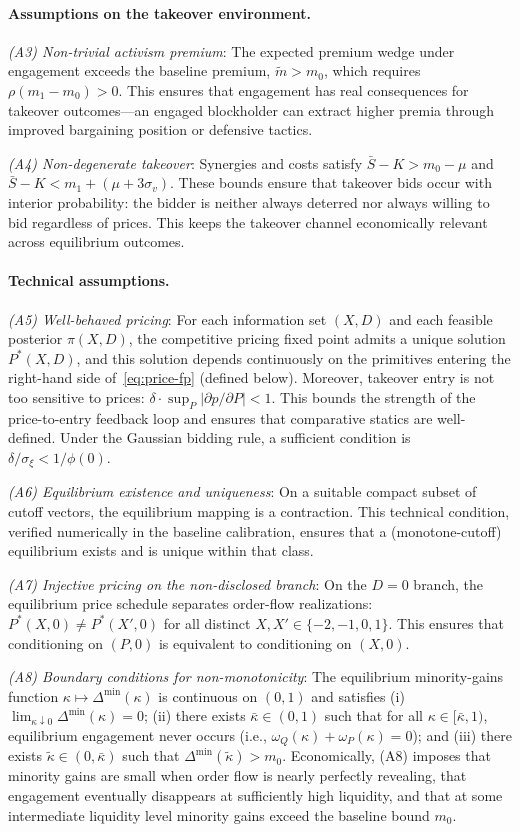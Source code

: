 \documentclass[11pt]{article}
\newcommand{\1}{\mathbf{1}}
\begin{document}
\paragraph{Assumptions on the takeover environment.}
\textit{(A3) Non-trivial activism premium}: The expected premium wedge under engagement exceeds the baseline premium, $\tilde{m}>m_0$, which requires $\rho(m_1-m_0)>0$. This ensures that engagement has real consequences for takeover outcomes---an engaged blockholder can extract higher premia through improved bargaining position or defensive tactics.

\textit{(A4) Non-degenerate takeover}: Synergies and costs satisfy $\bar{S}-K > m_0-\mu$ and $\bar{S}-K < m_1+(\mu+3\sigma_v)$. These bounds ensure that takeover bids occur with interior probability: the bidder is neither always deterred nor always willing to bid regardless of prices. This keeps the takeover channel economically relevant across equilibrium outcomes.

\paragraph{Technical assumptions.}
\textit{(A5) Well-behaved pricing}: For each information set $(X,D)$ and each feasible posterior $\pi(X,D)$, the competitive pricing fixed point admits a unique solution $P^*(X,D)$, and this solution depends continuously on the primitives entering the right-hand side of~\eqref{eq:price-fp} (defined below). Moreover, takeover entry is not too sensitive to prices: $\delta\cdot\sup_P|\partial p/\partial P|<1$. This bounds the strength of the price-to-entry feedback loop and ensures that comparative statics are well-defined. Under the Gaussian bidding rule, a sufficient condition is $\delta/\sigma_\xi < 1/\phi(0)$.

\textit{(A6) Equilibrium existence and uniqueness}: On a suitable compact subset of cutoff vectors, the equilibrium mapping is a contraction. This technical condition, verified numerically in the baseline calibration, ensures that a (monotone-cutoff) equilibrium exists and is unique within that class.

\textit{(A7) Injective pricing on the non-disclosed branch}: On the $D=0$ branch, the equilibrium price schedule separates order-flow realizations: $P^*(X,0)\neq P^*(X',0)$ for all distinct $X,X'\in\{-2,-1,0,1\}$. This ensures that conditioning on $(P,0)$ is equivalent to conditioning on $(X,0)$.

\textit{(A8) Boundary conditions for non-monotonicity}: The equilibrium minority-gains function $\kappa\mapsto \Delta^{\min}(\kappa)$ is continuous on $(0,1)$ and satisfies (i) $\lim_{\kappa\downarrow 0}\Delta^{\min}(\kappa)=0$; (ii) there exists $\bar{\kappa}\in(0,1)$ such that for all $\kappa\in[\bar{\kappa},1)$, equilibrium engagement never occurs (i.e., $\omega_Q(\kappa)+\omega_P(\kappa)=0$); and (iii) there exists $\tilde{\kappa}\in(0,\bar{\kappa})$ such that $\Delta^{\min}(\tilde{\kappa})>m_0$.
Economically, \textup{(A8)} imposes that minority gains are small when order flow is nearly perfectly revealing, that engagement eventually disappears at sufficiently high liquidity, and that at some intermediate liquidity level minority gains exceed the baseline bound $m_0$.
\end{document}
